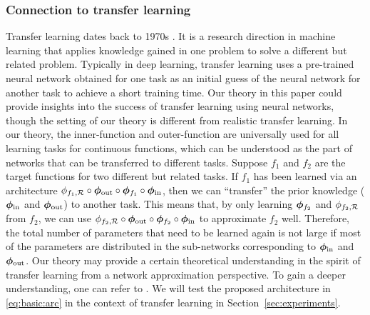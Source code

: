 \documentclass[nohyperref]{article}
\def\bmphiin{\bmphi_{\tn{in}}}
\def\bmphiout{\bmphi_{\tn{out}}}
\theoremstyle{plain}
\theoremstyle{definition}
\theoremstyle{remark}
\begin{document}



\subsubsection{Connection to transfer learning}


Transfer learning dates back to 1970s \cite{transfer1,transfer2}.
It is a research direction in machine learning that
applies knowledge gained in one problem to solve a different but related problem.  Typically in deep learning, transfer learning uses a  pre-trained neural network obtained for one task as an initial guess of the neural network for another task to achieve a short training time. %
Our theory in this paper could provide insights into the success of transfer learning using neural networks, though the setting of our theory is different from realistic transfer learning. In our theory, the inner-function and outer-function are universally used for all learning tasks for continuous functions, which can be understood as the part of networks that can be transferred to different tasks. Suppose $f_1$ and $f_2$ are the target functions for two different but related tasks. If $f_1$ has been learned via an architecture $\phi_{f_1,\calR}\circ\bmphiout\circ\bmphi_{f_1}\circ\bmphiin$, then we can ``transfer'' the prior knowledge ($\bmphiin$ and $\bmphiout$) to another task. This means that, by only learning ${\bm{\phi}}_{f_2}$ and $\phi_{f_2,{\mathcal{R}}}$ from $f_2$, we can use $\phi_{f_2,\calR}\circ\bmphiout\circ\bmphi_{f_2}\circ\bmphiin$ to approximate $f_2$ well. Therefore, the total number of parameters that need to be learned again is not large if most of the parameters are distributed in the sub-networks corresponding to $\bmphiin$ and $\bmphiout$. 
Our theory may provide a certain theoretical understanding in the spirit of transfer learning from a network approximation perspective. To gain a deeper understanding, one can refer to \cite{doi:10.1177/1059712318818568,NIPS1992_67e103b0,Baxter1998,Mihalkova2007,pmlr-v2-niculescu-mizil07a,TL1,TL2}.
We will test the proposed architecture in \eqref{eq:basic:arc} in the context of transfer learning in Section~\ref{sec:experiments}.
\end{document}
